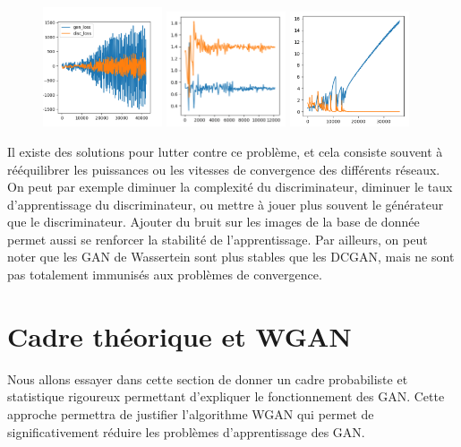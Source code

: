 \begin{figure}[!h]
\centering
\includegraphics[width=100pt]{"images/GAN/failure1"}
\includegraphics[width=100pt]{"images/GAN/failure2"}
\includegraphics[width=100pt]{"images/GAN/failure3"}
\caption{}
\label{perte_eq}
\end{figure}


Il existe des solutions pour lutter contre ce problème, et cela consiste souvent à rééquilibrer les puissances ou les vitesses de convergence des différents réseaux. On peut par exemple diminuer la complexité du discriminateur, diminuer le taux d'apprentissage du discriminateur, ou mettre à jouer plus souvent le générateur que le discriminateur.
Ajouter du bruit sur les images de la base de donnée permet aussi se renforcer la stabilité de l'apprentissage. Par ailleurs, on peut noter que les GAN de Wassertein sont plus stables que les DCGAN, mais ne sont pas totalement immunisés aux problèmes de convergence.

\section{Cadre théorique et WGAN}
Nous allons essayer dans cette section de donner un cadre probabiliste et statistique rigoureux permettant d'expliquer le fonctionnement des GAN. Cette approche permettra de justifier l'algorithme WGAN qui permet de significativement réduire les problèmes d'apprentissage des GAN.

